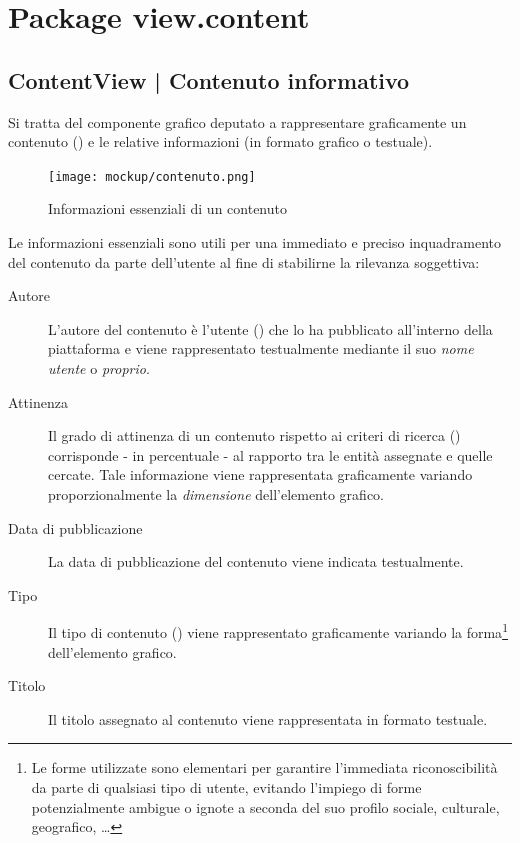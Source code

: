\documentclass[10pt,a4paper,headinclude,footinclude,hidelinks]{scrreprt} %
\begin{document}
	\section{Package view.content}
	\label{sec:stage:design:view.content}

	\subsection[ContentView]{ContentView | Contenuto informativo}
	\label{sec:stage:design:view:content-widget}
	Si tratta del componente grafico deputato a rappresentare graficamente un contenuto (\textit{}) e le relative informazioni (in formato grafico o testuale).

	\begin{figure}[ht]
		\begin{center}
	    	\texttt{[image: mockup/contenuto.png]}
			\label{gfx:mockup:content}
			\caption{Informazioni essenziali di un contenuto}
		\end{center}
	\end{figure}

	Le informazioni essenziali sono utili per una immediato e preciso inquadramento del contenuto da parte dell'utente al fine di stabilirne la rilevanza soggettiva:
	\begin{description}
	\item[Autore] L'autore del contenuto è l'utente (\textit{}) che lo ha pubblicato all'interno della piattaforma e viene rappresentato testualmente mediante il suo \textit{nome utente} o \textit{proprio}.
	\item[Attinenza] Il grado di attinenza di un contenuto rispetto ai criteri di ricerca (\textit{}) corrisponde - in percentuale - al rapporto tra le entità assegnate e quelle cercate. Tale informazione viene rappresentata graficamente variando proporzionalmente la \textit{dimensione} dell'elemento grafico.
	\item[Data di pubblicazione] La data di pubblicazione del contenuto viene indicata testualmente.
	\item[Tipo] Il tipo di contenuto (\textit{}) viene rappresentato graficamente variando la forma\footnote{Le forme utilizzate sono elementari per garantire l'immediata riconoscibilità da parte di qualsiasi tipo di utente, evitando l'impiego di forme potenzialmente ambigue o ignote a seconda del suo profilo sociale, culturale, geografico, \ldots} dell'elemento grafico.
	\item[Titolo] Il titolo assegnato al contenuto viene rappresentata in formato testuale.
	\end{description}
\end{document}
